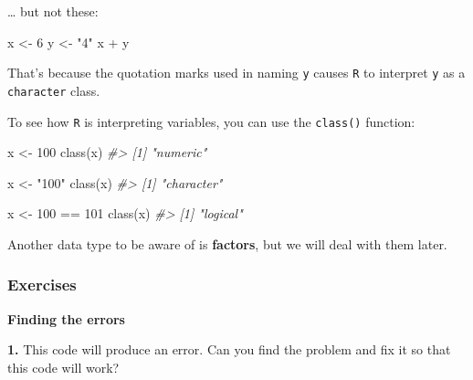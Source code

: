 \documentclass[
]{book}
\newenvironment{Shaded}{\begin{snugshade}}{\end{snugshade}}
\newcommand{\CommentTok}[1]{\textcolor[rgb]{0.56,0.35,0.01}{\textit{#1}}}
\newcommand{\DecValTok}[1]{\textcolor[rgb]{0.00,0.00,0.81}{#1}}
\newcommand{\FunctionTok}[1]{\textcolor[rgb]{0.00,0.00,0.00}{#1}}
\newcommand{\NormalTok}[1]{#1}
\newcommand{\OtherTok}[1]{\textcolor[rgb]{0.56,0.35,0.01}{#1}}
\newcommand{\SpecialCharTok}[1]{\textcolor[rgb]{0.00,0.00,0.00}{#1}}
\newcommand{\StringTok}[1]{\textcolor[rgb]{0.31,0.60,0.02}{#1}}
\begin{document}
\ldots{} but not these:

\begin{Shaded}
\begin{Highlighting}[]
\NormalTok{x }\OtherTok{\textless{}{-}} \DecValTok{6}
\NormalTok{y }\OtherTok{\textless{}{-}} \StringTok{"4"}
\NormalTok{x }\SpecialCharTok{+}\NormalTok{ y}
\end{Highlighting}
\end{Shaded}

That's because the quotation marks used in naming \texttt{y} causes \texttt{R} to interpret \texttt{y} as a \texttt{character} class.

To see how \texttt{R} is interpreting variables, you can use the \texttt{class()} function:

\begin{Shaded}
\begin{Highlighting}[]
\NormalTok{x }\OtherTok{\textless{}{-}} \DecValTok{100}
\FunctionTok{class}\NormalTok{(x)}
\CommentTok{\#\textgreater{} [1] "numeric"}
\end{Highlighting}
\end{Shaded}

\begin{Shaded}
\begin{Highlighting}[]
\NormalTok{x }\OtherTok{\textless{}{-}} \StringTok{"100"}
\FunctionTok{class}\NormalTok{(x)}
\CommentTok{\#\textgreater{} [1] "character"}
\end{Highlighting}
\end{Shaded}

\begin{Shaded}
\begin{Highlighting}[]
\NormalTok{x }\OtherTok{\textless{}{-}} \DecValTok{100} \SpecialCharTok{==} \DecValTok{101}
\FunctionTok{class}\NormalTok{(x)}
\CommentTok{\#\textgreater{} [1] "logical"}
\end{Highlighting}
\end{Shaded}

Another data type to be aware of is \textbf{factors}, but we will deal with them later.

\hypertarget{exercises-2}{%
\subsubsection*{Exercises}\label{exercises-2}}

\textbf{Finding the errors}

\textbf{1.} This code will produce an error. Can you find the problem and fix it so that this code will work?
\end{document}
